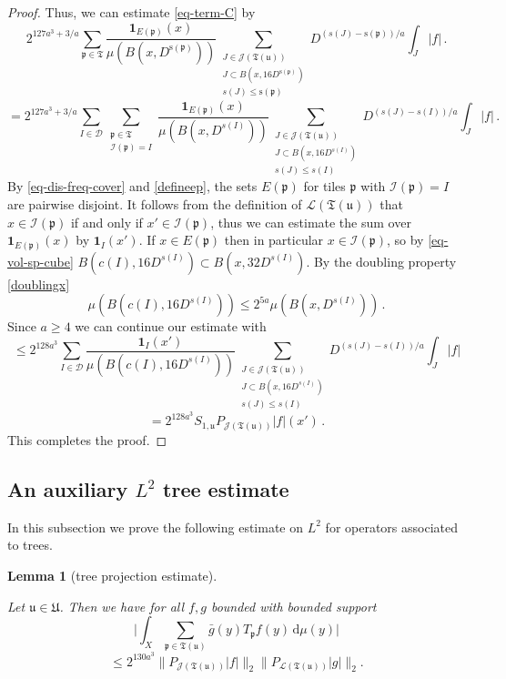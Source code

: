\documentclass[10pt,a4paper]{article}
\theoremstyle{plain}
\newtheorem{lemma}[theorem]{Lemma}
\theoremstyle{definition}
\numberwithin{equation}{subsection}
\newcommand{\fp}{{\mathfrak p}}
\newcommand{\fu}{{\mathfrak u}}
\newcommand{\fU}{{\mathfrak U}}
\newcommand{\fT}{{\mathfrak T}}
\newcommand{\ps}{{\mathrm{s}}}
\newcommand{\scI}{{\mathcal{I}}} %
\newcommand{\lean}[1]{}
\newcommand{\uses}[1]{}
\newcommand{\leanok}{}
\begin{document}
\begin{proof}
    Thus, we can estimate \eqref{eq-term-C} by
    $$
        2^{127a^3 + 3/a}\sum_{\fp\in \mathfrak{T}}\frac{\mathbf{1}_{E(\fp)}(x)}{\mu(B(x,D^{\ps(\fp)}))}\sum_{\substack{J\in \mathcal{J}(\fT(\fu))\\J\subset B(x, 16D^{\ps(\fp)})\\ s(J) \le \ps(\fp)}} D^{(s(J) - \ps(\fp))/a} \int_J |f|\,.
    $$
    $$
        = 2^{127a^3 + 3/a}\sum_{I \in \mathcal{D}} \sum_{\substack{\fp\in \mathfrak{T}\\ \scI(\fp) = I}}\frac{\mathbf{1}_{E(\fp)}(x)}{\mu(B(x, D^{s(I)}))}\sum_{\substack{J\in \mathcal{J}(\fT(\fu))\\J\subset B(x, 16 D^{s(I)})\\ s(J) \le s(I)}} D^{(s(J) - s(I))/a} \int_J |f|\,.
    $$
    By \eqref{eq-dis-freq-cover} and \eqref{defineep}, the sets $E(\fp)$ for tiles $\fp$ with $\scI(\fp) = I$ are pairwise disjoint. It follows from the definition of $\mathcal{L}(\fT(\fu))$ that $x \in \scI(\fp)$ if and only if $x' \in \scI(\fp)$, thus we can estimate the sum over $\mathbf{1}_{E(\fp)}(x)$ by $\mathbf{1}_{I}(x')$.
    If $x \in E(\fp)$ then in particular $x \in \scI(\fp)$, so by \eqref{eq-vol-sp-cube} $B(c(I),16D^{s(I)}) \subset B(x, 32D^{s(I)})$. By the doubling property \eqref{doublingx}
    $$
        \mu(B(c(I), 16D^{s(I)})) \le 2^{5a} \mu(B(x, D^{s(I)}))\,.
    $$
    Since $a \ge 4$ we can continue our estimate with
    $$
        \le 2^{128a^3}\sum_{I \in \mathcal{D}} \frac{\mathbf{1}_{I}(x')}{\mu(B(c(I), 16D^{s(I)}))}\sum_{\substack{J\in \mathcal{J}(\fT(\fu))\\J\subset B(x, 16 D^{s(I)})\\ s(J) \le s(I)}} D^{(s(J) - s(I))/a} \int_J |f|
    $$
    $$
         = 2^{128a^3} S_{1,\fu} P_{\mathcal{J}(\fT(\fu))}|f|(x')\,.
    $$
    This completes the proof.
\end{proof}

\subsection{An auxiliary \texorpdfstring{$L^2$}{L2} tree estimate}

In this subsection we prove the following estimate on $L^2$ for operators associated to trees.

\begin{lemma}[tree projection estimate]
    \label{tree-projection-estimate}
    \leanok
    \lean{TileStructure.Forest.tree_projection_estimate}
    \uses{dyadic-partitions,pointwise-tree-estimate,nontangential-operator-bound,boundary-operator-bound}
    Let $\fu \in \fU$.
    Then we have for all $f, g$ bounded with bounded support
    $$
        \Bigg|\int_X \sum_{\fp \in \fT(\fu)} \bar g(y) T_{\fp}f(y) \, \mathrm{d}\mu(y) \Bigg|
    $$
    \begin{equation}
        \label{eq-tree-est}
         \le 2^{130a^3}\|P_{\mathcal{J}(\fT(\fu))}|f|\|_{2}\|P_{\mathcal{L}(\fT(\fu))}|g|\|_{2}.
    \end{equation}
\end{lemma}
\end{document}
